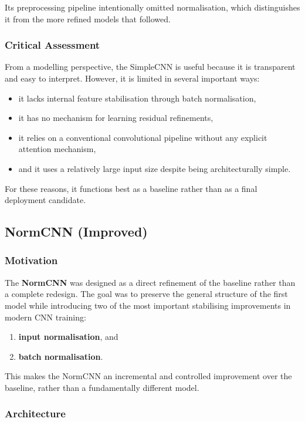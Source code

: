 \documentclass{article}
\begin{document}
Its preprocessing pipeline intentionally omitted normalisation, which distinguishes it from the more refined models that followed.

\subsubsection{Critical Assessment}

From a modelling perspective, the SimpleCNN is useful because it is transparent and easy to interpret. However, it is limited in several important ways:
\begin{itemize}
    \item it lacks internal feature stabilisation through batch normalisation,
    \item it has no mechanism for learning residual refinements,
    \item it relies on a conventional convolutional pipeline without any explicit attention mechanism,
    \item and it uses a relatively large input size despite being architecturally simple.
\end{itemize}

For these reasons, it functions best as a baseline rather than as a final deployment candidate.

\subsection{NormCNN (Improved)}

\subsubsection{Motivation}

The \textbf{NormCNN} was designed as a direct refinement of the baseline rather than a complete redesign. The goal was to preserve the general structure of the first model while introducing two of the most important stabilising improvements in modern CNN training:
\begin{enumerate}
    \item \textbf{input normalisation}, and
    \item \textbf{batch normalisation}.
\end{enumerate}

This makes the NormCNN an incremental and controlled improvement over the baseline, rather than a fundamentally different model.

\subsubsection{Architecture}
\end{document}
